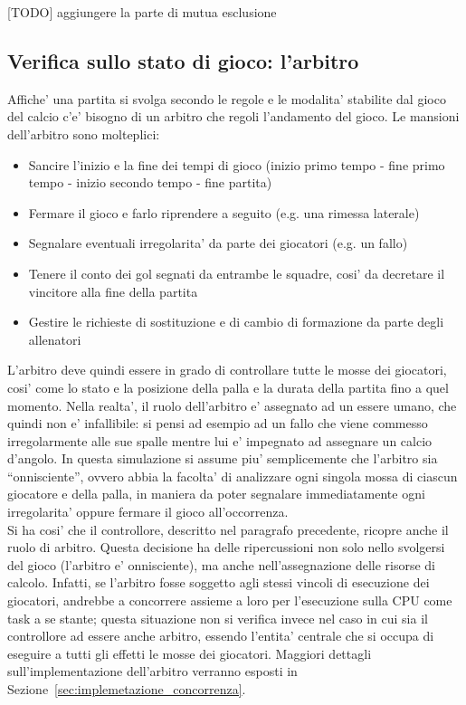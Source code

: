 [TODO] aggiungere la parte di mutua esclusione

\subsection*{Verifica sullo stato di gioco: l'arbitro}
%
\label{sec:modello_verifica_arbitro}

Affiche' una partita si svolga secondo le regole e le modalita' stabilite dal gioco del calcio c'e' bisogno di un arbitro che regoli l'andamento del gioco. Le mansioni dell'arbitro sono molteplici:

\begin{itemize}
	\item Sancire l'inizio e la fine dei tempi di gioco (inizio primo tempo - fine primo tempo - inizio secondo tempo - fine partita)
	\item Fermare il gioco e farlo riprendere a seguito (e.g. una rimessa laterale)
	\item Segnalare eventuali irregolarita' da parte dei giocatori (e.g. un fallo)
	\item Tenere il conto dei gol segnati da entrambe le squadre, cosi' da decretare il vincitore alla fine della partita
	\item Gestire le richieste di sostituzione e di cambio di formazione da parte degli allenatori
\end{itemize}

L'arbitro deve quindi essere in grado di controllare tutte le mosse dei giocatori, cosi' come lo stato e la posizione della palla e la durata della partita fino a quel momento. Nella realta', il ruolo dell'arbitro e' assegnato ad un essere umano, che quindi non e' infallibile: si pensi ad esempio ad un fallo che viene commesso irregolarmente alle sue spalle mentre lui e' impegnato ad assegnare un calcio d'angolo. In questa simulazione si assume piu' semplicemente che l'arbitro sia ``onnisciente'', ovvero abbia la facolta' di analizzare ogni singola mossa di ciascun giocatore e della palla, in maniera da poter segnalare immediatamente ogni irregolarita' oppure fermare il gioco all'occorrenza.\\

Si ha cosi' che il controllore, descritto nel paragrafo precedente, ricopre anche il ruolo di arbitro. Questa decisione ha delle ripercussioni non solo nello svolgersi del gioco (l'arbitro e' onnisciente), ma anche nell'assegnazione delle risorse di calcolo. Infatti, se l'arbitro fosse soggetto agli stessi vincoli di esecuzione dei giocatori, andrebbe a concorrere assieme a loro per l'esecuzione sulla CPU come task a se stante; questa situazione non si verifica invece nel caso in cui sia il controllore ad essere anche arbitro, essendo l'entita' centrale che si occupa di eseguire a tutti gli effetti le mosse dei giocatori. Maggiori dettagli sull'implementazione dell'arbitro verranno esposti in Sezione~\ref{sec:implemetazione_concorrenza}.\\

